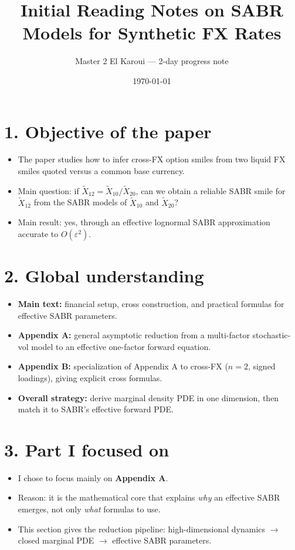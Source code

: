 \documentclass[11pt,a4paper]{article}
\title{\textbf{Initial Reading Notes on SABR Models for Synthetic FX Rates}}
\author{Master 2 El Karoui --- 2-day progress note}
\date{\today}
\begin{document}
\maketitle
\vspace{-1.0em}

\section*{1. Objective of the paper}
\begin{itemize}
    \item The paper studies how to infer cross-FX option smiles from two liquid FX smiles quoted versus a common base currency.
    \item Main question: if \(\widetilde X_{12}=\widetilde X_{10}/\widetilde X_{20}\), can we obtain a reliable SABR smile for \(\widetilde X_{12}\) from the SABR models of \(\widetilde X_{10}\) and \(\widetilde X_{20}\)?
    \item Main result: yes, through an effective lognormal SABR approximation accurate to \(O(\varepsilon^2)\).
\end{itemize}

\section*{2. Global understanding}
\begin{itemize}
    \item \textbf{Main text:} financial setup, cross construction, and practical formulas for effective SABR parameters.
    \item \textbf{Appendix A:} general asymptotic reduction from a multi-factor stochastic-vol model to an effective one-factor forward equation.
    \item \textbf{Appendix B:} specialization of Appendix A to cross-FX (\(n=2\), signed loadings), giving explicit cross formulas.
    \item \textbf{Overall strategy:} derive marginal density PDE in one dimension, then match it to SABR's effective forward PDE.
\end{itemize}

\section*{3. Part I focused on}
\begin{itemize}
    \item I chose to focus mainly on \textbf{Appendix A}.
    \item Reason: it is the mathematical core that explains \emph{why} an effective SABR emerges, not only \emph{what} formulas to use.
    \item This section gives the reduction pipeline: high-dimensional dynamics \(\to\) closed marginal PDE \(\to\) effective SABR parameters.
\end{itemize}
\end{document}
